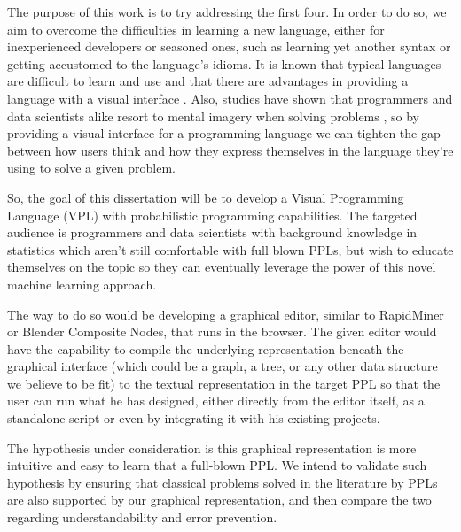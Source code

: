 The purpose of this work is to try addressing the first four. In order to do so, we
aim to overcome the difficulties in learning a new language, either for
inexperienced developers or seasoned ones, such as learning yet another syntax
or getting accustomed to the language's idioms. It is known that typical
languages are difficult to learn and use \cite{Lewis1987} and that there are
advantages in providing a language with a visual interface \cite{dfbeg}. Also,
studies have shown that programmers and data scientists alike resort to mental
imagery when solving problems \cite{Dastani2002}\cite{Petre1999}, so by
providing a visual interface for a programming language
we can tighten the gap between how users think and how they
express themselves in the language they're using to solve a given problem.

So, the goal of this dissertation will be to develop a Visual Programming
Language (VPL) with probabilistic programming capabilities. The targeted
audience is programmers and data scientists with background knowledge in
statistics which aren't still comfortable
with full blown PPLs, but wish to educate themselves on the topic so they can
eventually leverage the power of this novel machine learning approach.

The way to do so would be developing a graphical editor, similar to
RapidMiner or Blender Composite Nodes, that runs in the browser. The given
editor would have the capability to compile the underlying representation beneath
the graphical interface (which could be a graph, a tree, or any other data structure
we believe to be fit) to the textual
representation in the target PPL so that the user can run what he has designed,
either directly from the editor itself, as a standalone script or even by
integrating it with his existing projects.

The hypothesis under consideration is this graphical representation
is more intuitive and easy to learn that a full-blown PPL.
We intend to validate such hypothesis by ensuring that classical problems solved
in the literature by PPLs are also supported by our graphical representation,
and then compare the two regarding understandability and error prevention.
